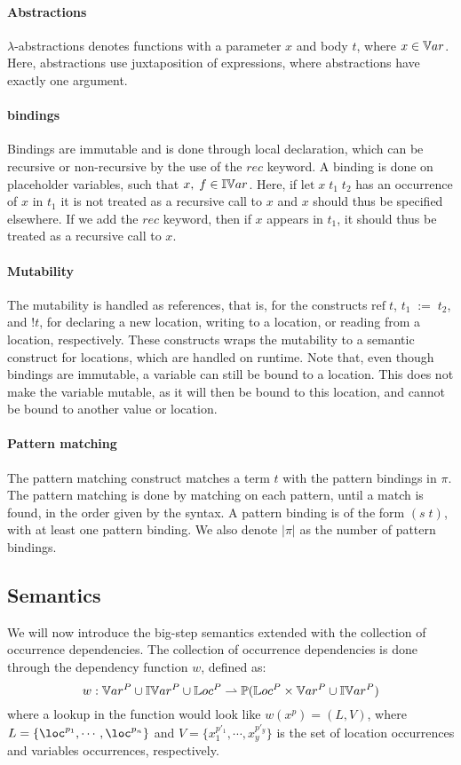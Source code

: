 \documentclass[../../master.tex]{subfiles}
\begin{document}
\paragraph{Abstractions}
$\lambda$-abstractions denotes functions with a parameter $x$ and body $t$, where $x\in\mathbb{V}ar$.
Here, abstractions use juxtaposition of expressions, where abstractions have exactly one argument.

\paragraph{bindings}
Bindings are immutable and is done through local declaration, which can be recursive or non-recursive by the use of the $rec$ keyword.
A binding is done on placeholder variables, such that $x,\;f\in\mathbb{IV}ar$.
Here, if $\mbox{let}\;x\;t_1\;t_2$ has an occurrence of $x$ in $t_1$ it is not treated as a recursive call to $x$ and $x$ should thus be specified elsewhere.
If we add the $rec$ keyword, then if $x$ appears in $t_1$, it should thus be treated as a recursive call to $x$.

\paragraph{Mutability}
The mutability is handled as references, that is, for the constructs $\mbox{ref}\;t$, $t_1\;:=\;t_2$, and $!t$, for declaring a new location, writing to a location, or reading from a location, respectively.
These constructs wraps the mutability to a semantic construct for locations, which are handled on runtime.
Note that, even though bindings are immutable, a variable can still be bound to a location.
This does not make the variable mutable, as it will then be bound to this location, and cannot be bound to another value or location.

\paragraph{Pattern matching}
The pattern matching construct matches a term $t$ with the pattern bindings in $\pi$.
The pattern matching is done by matching on each pattern, until a match is found, in the order given by the syntax.
A pattern binding is of the form $(s\;t)$, with at least one pattern binding.
We also denote $|\pi|$ as the number of pattern bindings.

\subsection{Semantics}\label{sec:sem}
We will now introduce the big-step semantics extended with the collection of occurrence dependencies.
The collection of occurrence dependencies is done through the dependency function $w$, defined as:
$$w:\mathbb{V}ar^P\cup\mathbb{IV}ar^P\cup\mathbb{L}oc^P\rightharpoonup\mathbb{P}(\mathbb{L}oc^P\times\mathbb{V}ar^P\cup\mathbb{IV}ar^P)$$
where a lookup in the function would look like $w(x^p)=(L,V)$, where $L=\{\loc^{p_1},\cdots,\loc^{p_n}\}$ and $V=\{x_1^{p'_1},\cdots,x_y^{p'_y}\}$ is the set of location occurrences and variables occurrences, respectively.
\end{document}
